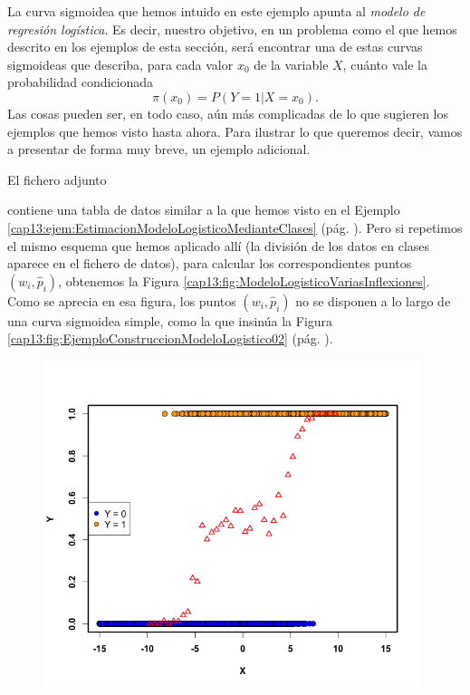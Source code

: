 \noindent La curva sigmoidea que hemos intuido en este ejemplo apunta al {\em modelo de regresión
logística}. Es decir, nuestro objetivo, en un problema como el que hemos descrito en los ejemplos
de esta sección, será encontrar una de estas curvas sigmoideas que describa, para cada valor $x_0$
de la variable $X$, cuánto vale la probabilidad condicionada
\begin{equation}
\label{cap13:ecu:NotacionPiProbabilidadCondicionada}
\pi(x_0)=P(Y=1|X=x_0).
\end{equation}
Las cosas pueden ser, en todo caso, aún más complicadas de lo que sugieren los ejemplos que hemos visto hasta ahora. Para ilustrar lo que queremos decir, vamos a presentar de forma muy breve, un ejemplo adicional.
\begin{ejemplo}
\label{cap13:ejem:EstimacionModeloLogisticoVariasInflexiones}
El fichero adjunto
\begin{center}
\end{center}
contiene una tabla de datos similar a la que hemos visto en el Ejemplo \ref{cap13:ejem:EstimacionModeloLogisticoMedianteClases} (pág. \pageref{cap13:ejem:EstimacionModeloLogisticoMedianteClases}). Pero si repetimos el mismo esquema que hemos aplicado allí (la división de los datos en clases aparece en el fichero de datos), para calcular los correspondientes puntos $(w_i, \hat p_i)$, obtenemos la Figura
\ref{cap13:fig:ModeloLogisticoVariasInflexiones}. Como se aprecia en esa figura, los puntos $(w_i, \hat p_i)$ no se disponen a lo largo de una curva sigmoidea simple, como la que insinúa la Figura \ref{cap13:fig:EjemploConstruccionModeloLogistico02} (pág. \pageref{cap13:fig:EjemploConstruccionModeloLogistico02}).
\begin{figure}[h!]
\begin{center}
\begin{enColor}
    \includegraphics[width=11cm]{../fig/Cap13-EstimacionModeloLogisticoVariasInflexiones.png}

\end{enColor}
\end{center}
\end{figure}
\end{ejemplo}
